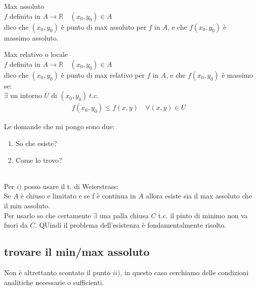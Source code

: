 \documentclass[a4paper, oneside]{article}
\begin{document}
        \begin{definition}
            Max assoluto\\
            $f$ definita in $A \to \mathbb{R} \quad (x_0,y_0) \in A$ \\
            dico che $(x_0,y_0)$ è punto di max assoluto per $f$ in $A$, e che $f(x_0,y_0)$ è massimo assoluto.\\ 
        \end{definition}


        \begin{definition}
            Max relativo o locale\\
            $f$ definita in $A \to \mathbb{R} \quad (x_0,y_0) \in A$ \\
            dico che $(x_0,y_0)$ è punto di max relativo per $f$ in $A$, e che $f(x_0,y_0)$ è massimo se:\\
            $\exists$ un intorno $U$ di $(x_0,y_0) \ t.c.$\\
            \begin{gather*}
                f(x_0,y_0) \leq f(x,y) \quad \forall (x,y) \in U
            \end{gather*} 
        \end{definition}


        Le domande che mi pongo sono due:
        \begin{enumerate}[$i)$]
            \item So che esiste?
            \item Come lo trovo?
        \end{enumerate}            
        \hfil\\
        Per $i)$ posso usare il t. di Weierstrass:\\
        Se $A$ è chiuso e limitato e se f è continua in $A$ allora esiste sia il max assoluto che il min assoluto.\\
        Per usarlo so che certamente $\exists$ una palla chiusa $C$ t.c. il pinto di minimo non va fuori da $C$. QUindi il problema dell'esistenza è fondamentalmente risolto.\\
        
        
        
        \subsection{trovare il min/max assoluto}
        Non è altrettanto scontato il punto $ii)$, in questo caso cerchiamo delle condizioni analitiche necessarie o sufficienti.\\
        
\end{document}

